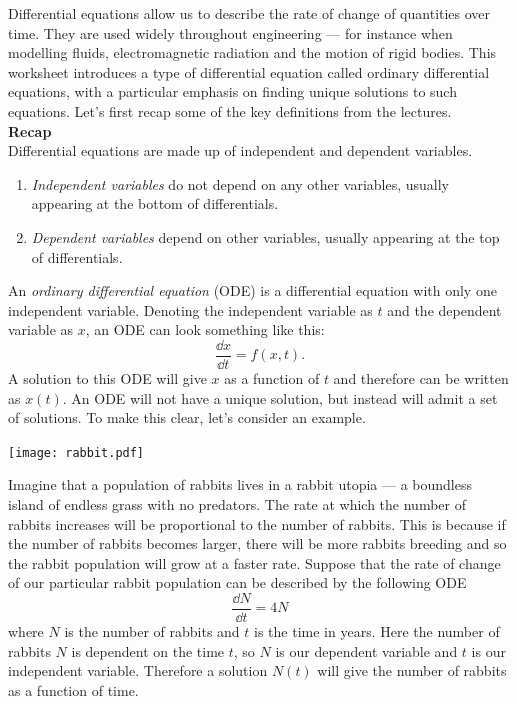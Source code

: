 Differential equations allow us to describe the rate of change of quantities over time. They are used widely throughout engineering --- for instance when modelling fluids, electromagnetic radiation and the motion of rigid bodies. This worksheet introduces a type of differential equation called ordinary differential equations, with a particular emphasis on finding unique solutions to such equations. Let's first recap some of the key definitions from the lectures.\\

{\bf Recap}\\
Differential equations are made up of independent and dependent variables.
\begin{enumerate}
 \item {\em Independent variables} do not depend on any other variables, usually appearing at the bottom of differentials.
 \item {\em Dependent variables} depend on other variables, usually appearing at the top of differentials.
 \end{enumerate}
An {\em ordinary differential equation} (ODE) is a differential equation with only one independent variable. Denoting the independent variable as $t$ and the dependent variable as $x$, an ODE can look something like this:
\begin{equation*}
 \frac{\dd x}{\dd t}=f(x,t).
\end{equation*}
A solution to this ODE will give $x$ as a function of $t$ and therefore can be written as $x(t)$. An ODE will not have a unique solution, but instead will admit a set of solutions. To make this clear, let's consider an example.\\

        \begin{center}
        \texttt{[image: rabbit.pdf]}
        \end{center}
Imagine that a population of rabbits lives in a rabbit utopia --- a boundless island of endless grass with no predators. The rate at which the number of rabbits increases will be proportional to the number of rabbits. This is because if the number of rabbits becomes larger, there will be more rabbits breeding and so the rabbit population will grow at a faster rate. Suppose that the rate of change of our particular rabbit population can be described by the following ODE
\begin{equation}\label{eq:rabbit}
 \frac{\dd N}{\dd t}=4 N
\end{equation}
where $N$ is the number of rabbits and $t$ is the time in years. Here the number of rabbits $N$ is dependent on the time $t$, so $N$ is our dependent variable and $t$ is our independent variable. Therefore a solution $N(t)$ will give the number of rabbits as a function of time.

